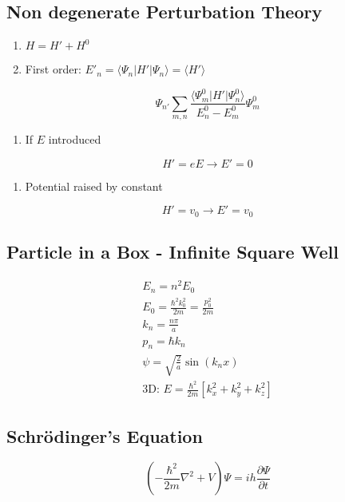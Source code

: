 \documentclass[10pt,letter]{article}
\begin{document}
\subsection{Non degenerate Perturbation Theory}
\begin{enumerate}
    \item $H = H' + H^0$ 
    \item First order: $E'_n = \langle \Psi_n | H' | \Psi_n \rangle = \langle H' \rangle $
\end{enumerate}


\begin{equation}
 \Psi_{n'} \sum \limits_{m,n} \frac{\langle \Psi_m^0 | H' | \Psi_n^0 \rangle }{E_n^0 - E_m^0} \Psi_m^0 
\end{equation}

\begin{enumerate}
    \item If $E$ introduced
\end{enumerate}
\begin{equation}
    H' = eE \rightarrow E' = 0
\end{equation}
\begin{enumerate}
    \item Potential raised by constant
\end{enumerate}
\begin{equation}
    H' = v_0 \rightarrow E' = v_0
\end{equation}

\subsection{Particle in a Box - Infinite Square Well}
\begin{align}
 E_n = n^2 E_0\\
 E_0 = \frac{\hbar^2 k_0^2}{2m} = \frac{p_0^2}{2m}\\
 k_n = \frac{n \pi}{a}\\
 p_n = \hbar k_n \\
 \psi = \sqrt{\frac{2}{a}}\sin(k_nx)\\
 \textrm{3D: }E= \frac{\hbar^2}{2m} [k_x^2 + k_y^2 + k_z^2]
\end{align}

\subsection{Schr\"odinger's Equation}
\begin{equation}
    \left( - \frac{\hbar^2}{2m} \nabla^2 + V \right) \Psi = ih \frac{\partial \Psi}{\partial t}
\end{equation}
\end{document}
